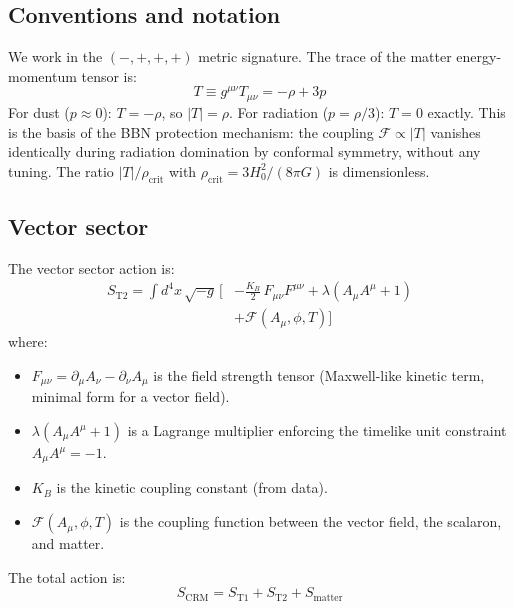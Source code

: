 \documentclass[aps,prd,twocolumn,superscriptaddress,nofootinbib]{revtex4-2}
\begin{document}
\subsection{Conventions and notation}
\label{sec:conventions}

We work in the $(-,+,+,+)$ metric signature. The trace of the matter energy-momentum tensor is:
\begin{equation}
T \equiv g^{\mu\nu}T_{\mu\nu} = -\rho + 3p
\label{eq:trace_def}
\end{equation}
For dust ($p \approx 0$): $T = -\rho$, so $|T| = \rho$. For radiation ($p = \rho/3$): $T = 0$ exactly. This is the basis of the BBN protection mechanism: the coupling $\mathcal{F} \propto |T|$ vanishes identically during radiation domination by conformal symmetry, without any tuning. The ratio $|T|/\rho_{\mathrm{crit}}$ with $\rho_{\mathrm{crit}} = 3H_0^2/(8\pi G)$ is dimensionless.

\subsection{Vector sector} %
\label{sec:vector_action}

The vector sector action is:
\begin{align}
S_{\mathrm{T2}} = \int d^4x\,\sqrt{-g}\,\bigg[&
  -\frac{K_B}{2}\,F_{\mu\nu}F^{\mu\nu}
  + \lambda\!\left(A_\mu A^\mu + 1\right)
\nonumber \\
  &+ \mathcal{F}(A_\mu, \phi, T)
\bigg]
\label{eq:S_T2}
\end{align}
where:
\begin{itemize}
\item $F_{\mu\nu} = \partial_\mu A_\nu - \partial_\nu A_\mu$ is the field strength tensor (Maxwell-like kinetic term, minimal form for a vector field).
\item $\lambda(A_\mu A^\mu + 1)$ is a Lagrange multiplier enforcing the timelike unit constraint $A_\mu A^\mu = -1$.
\item $K_B$ is the kinetic coupling constant (from data).
\item $\mathcal{F}(A_\mu, \phi, T)$ is the coupling function between the vector field, the scalaron, and matter.
\end{itemize}

The total action is:
\begin{equation}
S_{\mathrm{CRM}} = S_{\mathrm{T1}} + S_{\mathrm{T2}} + S_{\mathrm{matter}}
\label{eq:S_total}
\end{equation}
\end{document}
